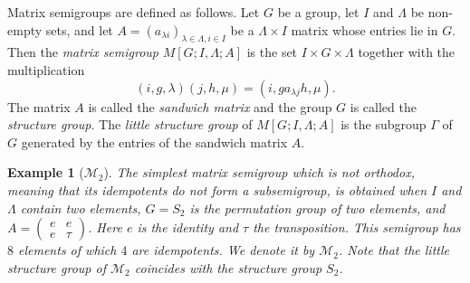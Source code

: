 \documentclass[10pt,a4paper]{amsart}
\newtheorem{example}[theorem]{Example}
\numberwithin{equation}{section}
\begin{document}
Matrix semigroups are defined as follows.
Let $G$ be a group, let  $I$ and $\Lambda$ be  non-empty sets, and let   
$A = (a_{\lambda i})_{\lambda\in \Lambda,i\in I}$ be a  $\Lambda\times I$ matrix whose entries lie in $G$. Then the  {\em matrix semigroup} $M[G;I,\Lambda;A]$ 
 is the set $I\times G \times  \Lambda$ together with the multiplication
\begin{equation*} (i ,g,\lambda)(j,h,\mu) = (i, g a_{\lambda  j} h,\mu).\end{equation*}
The matrix $A$ is called the {\em sandwich matrix} and the group $G$ is called the {\em structure group}. The {\em little structure group}  of $M[G;I,\Lambda;A]$ is the subgroup $\Gamma$ of $G$ generated by the entries of the sandwich matrix $A$. \begin{example}[$\mathcal M_2$] \label{ex:ex}
The simplest matrix semigroup which is not orthodox, meaning that its idempotents do not form a subsemigroup, is obtained when $I$ and $\Lambda$ contain two elements, $G=S_2$ is the permutation group of two elements, and $A=\begin{pmatrix} e & e \\ e & \tau \end{pmatrix}$. Here $e$ is the identity and $\tau$ the transposition. This semigroup has $8$ elements of which $4$ are idempotents. We denote it by $\mathcal M_2$. Note that the little structure group of $\mathcal M_2$ coincides with the structure group $S_2$.
\end{example}
\end{document}
